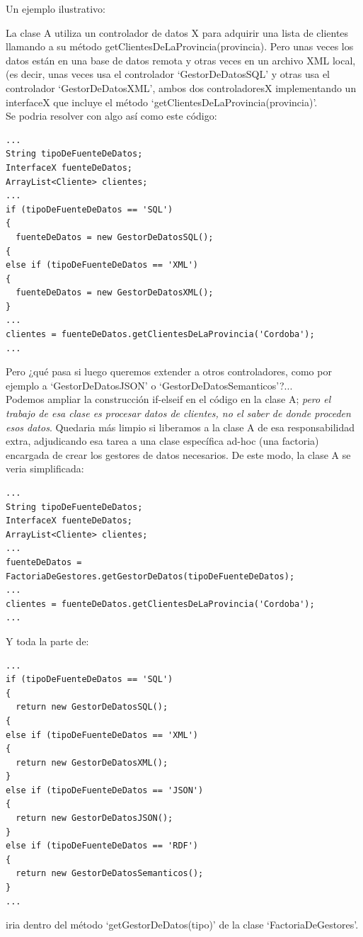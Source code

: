 \documentclass[spanish,12pt,a4paper,final,oneside]{book}
\begin{document}
\begin{footnotesize}
Un ejemplo ilustrativo:

La clase A utiliza un controlador de datos X para adquirir una lista de clientes llamando a su método getClientesDeLaProvincia(provincia). Pero unas veces los datos están en una base de datos remota y otras veces en un archivo XML local, (es decir, unas veces usa el controlador `GestorDeDatosSQL' y otras usa el controlador `GestorDeDatosXML', ambos dos controladoresX implementando un interfaceX que incluye el método `getClientesDeLaProvincia(provincia)'.
\\Se podria resolver con algo así como este código:
\begin{verbatim}
...
String tipoDeFuenteDeDatos;
InterfaceX fuenteDeDatos;
ArrayList<Cliente> clientes;
...
if (tipoDeFuenteDeDatos == 'SQL')
{
  fuenteDeDatos = new GestorDeDatosSQL();
{
else if (tipoDeFuenteDeDatos == 'XML')
{
  fuenteDeDatos = new GestorDeDatosXML();
}
...
clientes = fuenteDeDatos.getClientesDeLaProvincia('Cordoba');
...
\end{verbatim}
Pero ¿qué pasa si luego queremos extender a otros controladores, como por ejemplo a `GestorDeDatosJSON' o `GestorDeDatosSemanticos'?...\\
Podemos ampliar la construcción if-elseif en el código en la clase A; \textit{pero el trabajo de esa clase es procesar datos de clientes, no el saber de donde proceden esos datos}. Quedaria más limpio si liberamos a la clase A de esa responsabilidad extra, adjudicando esa tarea a una clase específica ad-hoc (una factoria) encargada de crear los gestores de datos necesarios. De este modo, la clase A se veria simplificada:
\begin{verbatim}
...
String tipoDeFuenteDeDatos;
InterfaceX fuenteDeDatos;
ArrayList<Cliente> clientes;
...
fuenteDeDatos = FactoriaDeGestores.getGestorDeDatos(tipoDeFuenteDeDatos);
...
clientes = fuenteDeDatos.getClientesDeLaProvincia('Cordoba');
...
\end{verbatim}
Y toda la parte de:
\begin{verbatim}
...
if (tipoDeFuenteDeDatos == 'SQL')
{
  return new GestorDeDatosSQL();
{
else if (tipoDeFuenteDeDatos == 'XML')
{
  return new GestorDeDatosXML();
}
else if (tipoDeFuenteDeDatos == 'JSON')
{
  return new GestorDeDatosJSON();
}
else if (tipoDeFuenteDeDatos == 'RDF')
{
  return new GestorDeDatosSemanticos();
}
...
\end{verbatim}
iria dentro del método `getGestorDeDatos(tipo)' de la clase `FactoriaDeGestores'.

\end{footnotesize}
\end{document}
